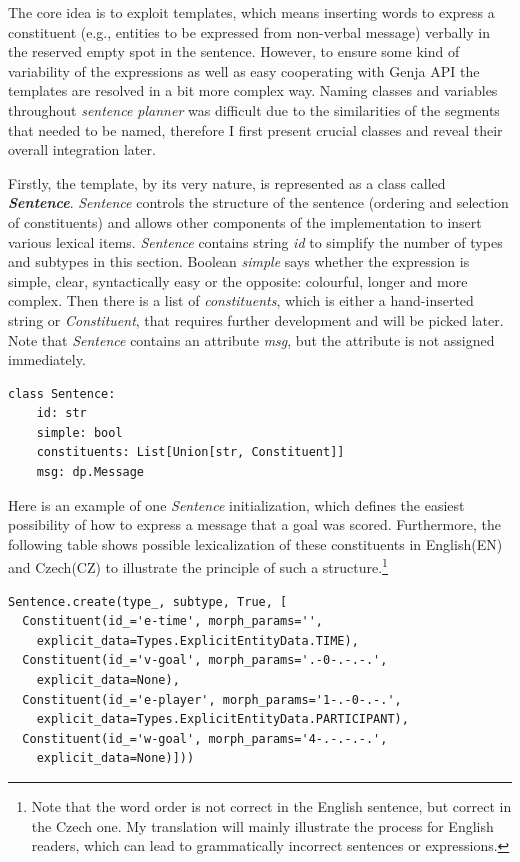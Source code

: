 The core idea is to exploit templates, which means inserting words to express a constituent (e.g., entities to be expressed from non-verbal message) verbally in the reserved empty spot in the sentence. However, to ensure some kind of variability of the expressions as well as easy cooperating with Genja API the templates are resolved in a bit more complex way. Naming classes and variables throughout \textit{sentence planner} was difficult due to the similarities of the segments that needed to be named, therefore I first present crucial classes and reveal their overall integration later.

Firstly, the template, by its very nature, is represented as a class called \textit{\textbf{Sentence}}. \textit{Sentence} controls the structure of the sentence (ordering and selection of constituents) and allows other components of the implementation to insert various lexical items. \textit{Sentence} contains string \textit{id} to simplify the number of types and subtypes in this section. Boolean \textit{simple} says whether the expression is simple, clear, syntactically easy or the opposite: colourful, longer and more complex. Then there is a list of \textit{constituents}, which is either a hand-inserted string or \textit{Constituent}, that requires further development and will be picked later. Note that \textit{Sentence} contains an attribute \textit{msg}, but the attribute is not assigned immediately.

\begin{Verbatim}[frame=single]
class Sentence:
	id: str
	simple: bool
	constituents: List[Union[str, Constituent]]
	msg: dp.Message
\end{Verbatim}
\newpage 

Here is an example of one \textit{Sentence} initialization, which defines the easiest possibility of how to express a message that a goal was scored. Furthermore, the following table shows possible lexicalization of these constituents in English(EN) and Czech(CZ) to illustrate the principle of such a structure.\footnote{Note that the word order is not correct in the English sentence, but correct in the Czech one. My translation will mainly illustrate the process for English readers, which can lead to grammatically incorrect sentences or expressions.}

\begin{Verbatim}[frame=single]
Sentence.create(type_, subtype, True, [
  Constituent(id_='e-time', morph_params='',
  	explicit_data=Types.ExplicitEntityData.TIME),
  Constituent(id_='v-goal', morph_params='.-0-.-.-.',
  	explicit_data=None),
  Constituent(id_='e-player', morph_params='1-.-0-.-.',
  	explicit_data=Types.ExplicitEntityData.PARTICIPANT),
  Constituent(id_='w-goal', morph_params='4-.-.-.-.',
  	explicit_data=None)]))
\end{Verbatim}

